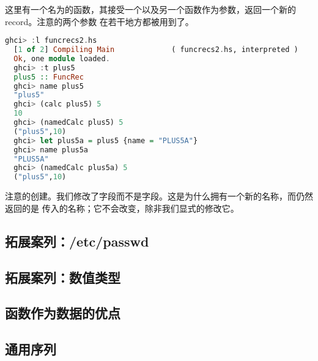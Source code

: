 \documentclass[./main.tex]{subfiles}
\begin{document}
这里有一个名为的函数，其接受一个以及另一个函数作为参数，返回一个新的 record。注意的两个参数
在若干地方都被用到了。

\begin{lstlisting}[language=Haskell]
  ghci> :l funcrecs2.hs
  [1 of 2] Compiling Main             ( funcrecs2.hs, interpreted )
  Ok, one module loaded.
  ghci> :t plus5
  plus5 :: FuncRec
  ghci> name plus5
  "plus5"
  ghci> (calc plus5) 5
  10
  ghci> (namedCalc plus5) 5
  ("plus5",10)
  ghci> let plus5a = plus5 {name = "PLUS5A"}
  ghci> name plus5a
  "PLUS5A"
  ghci> (namedCalc plus5a) 5
  ("plus5",10)
\end{lstlisting}

注意的创建。我们修改了字段而不是字段。这是为什么拥有一个新的名称，而仍然返回的是
传入的名称；它不会改变，除非我们显式的修改它。

\subsection*{拓展案列：/etc/passwd}

\subsection*{拓展案列：数值类型}

\subsection*{函数作为数据的优点}

\subsection*{通用序列}
\end{document}

